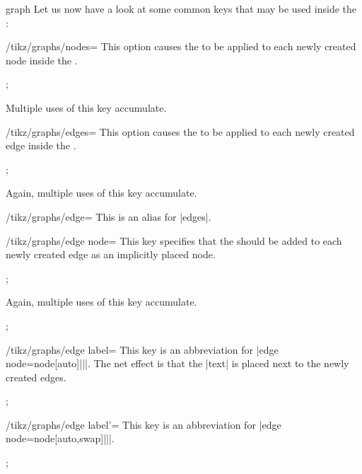 \begin{pathoperation}{graph}{}
    Let us now have a look at some common keys that may be used inside the
    :
    \begin{key}{/tikz/graphs/nodes=}
        This option causes the  to be applied to each newly
        created node inside the .
\begin{codeexample}[]
\tikz {};
\end{codeexample}
        Multiple uses of this key accumulate.
    \end{key}
    \begin{key}{/tikz/graphs/edges=}
        This option causes the  to be applied to each newly
        created edge inside the .
\begin{codeexample}[]
\tikz {};
\end{codeexample}
        Again, multiple uses of this key accumulate.
    \end{key}
    \begin{key}{/tikz/graphs/edge=}
        This is an alias for |edges|.
    \end{key}

    \begin{key}{/tikz/graphs/edge node=}
        This key specifies that the  should be added
        to each newly created edge as an implicitly placed node.
\begin{codeexample}[]
\tikz {};
\end{codeexample}
        Again, multiple uses of this key accumulate.
\begin{codeexample}[]
\tikz {};
\end{codeexample}
    \end{key}

    \begin{key}{/tikz/graphs/edge label=}
        This key is an abbreviation for |edge node=node[auto]{||}|.
        The net effect is that the |text| is placed next to the newly created
        edges.
\begin{codeexample}[]
\tikz {};
\end{codeexample}
    \end{key}

    \begin{key}{/tikz/graphs/edge label'=}
        This key is an abbreviation for |edge node=node[auto,swap]{||}|.
\begin{codeexample}[]
\tikz {};
\end{codeexample}
    \end{key}
\end{pathoperation}


